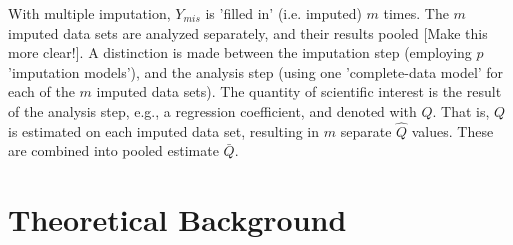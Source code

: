 \documentclass[article]{jss}
\begin{document}
With multiple imputation, $Y_{mis}$ is 'filled in' (i.e. imputed) $m$ times. The $m$ imputed data sets are analyzed separately, and their results pooled [Make this more clear!]. A distinction is made between the imputation step (employing $p$ 'imputation models'), and the analysis step (using one 'complete-data model' for each of the $m$ imputed data sets). The quantity of scientific interest is the result of the analysis step, e.g., a regression coefficient, and denoted with $Q$. That is, $Q$ is estimated on each imputed data set, resulting in $m$ separate $\hat{Q}$ values. These are combined into pooled estimate $\bar{Q}$.




% 
% 

\section{Theoretical Background} \label{sec:background}
\end{document}
